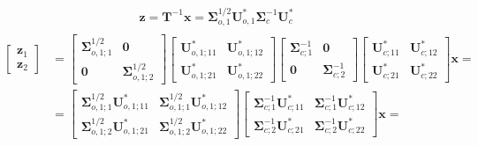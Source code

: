 \documentclass[letterpaper,10pt,english]{jupyterBook}
\begin{document}
\begin{equation*}
\begin{split}\mathbf{z} = \mathbf{T}^{-1} \mathbf{x} = \boldsymbol\Sigma_{o,1}^{1/2} \mathbf{U}_{o,1}^* \boldsymbol\Sigma_c^{-1} \mathbf{U}_c^*\end{split}
\end{equation*}\begin{equation*}
\begin{split}\begin{aligned}
\begin{bmatrix} \mathbf{z}_1 \\ \mathbf{z}_2 \end{bmatrix}
 & =
\begin{bmatrix} \boldsymbol\Sigma_{o,1;1}^{1/2} & \mathbf{0} \\ \mathbf{0} & \boldsymbol\Sigma_{o,1;2}^{1/2} \end{bmatrix}
\begin{bmatrix} \mathbf{U}_{o,1;11}^* & \mathbf{U}_{o,1;12}^* \\ \mathbf{U}_{o,1;21}^* & \mathbf{U}_{o,1;22}^* \end{bmatrix}
\begin{bmatrix} \boldsymbol\Sigma_{c  ;1}^{-1 } & \mathbf{0} \\ \mathbf{0} & \boldsymbol\Sigma_{c;2}^{-1} \end{bmatrix}
\begin{bmatrix} \mathbf{U}_{c;11}^* & \mathbf{U}_{c;12}^* \\ \mathbf{U}_{c;21}^* & \mathbf{U}_{c;22}^* \end{bmatrix}
 \mathbf{x} = \\
 & =
\begin{bmatrix} \boldsymbol\Sigma_{o,1;1}^{1/2}\mathbf{U}_{o,1;11}^* & \boldsymbol\Sigma_{o,1;1}^{1/2}\mathbf{U}_{o,1;12}^* \\ \boldsymbol\Sigma_{o,1;2}^{1/2} \mathbf{U}_{o,1;21}^* & \boldsymbol\Sigma_{o,1;2}^{1/2} \mathbf{U}_{o,1;22}^* \end{bmatrix}
\begin{bmatrix} \boldsymbol\Sigma_{c  ;1}^{-1 }\mathbf{U}_{c;11}^* & \boldsymbol\Sigma_{c  ;1}^{-1 }\mathbf{U}_{c;12}^* \\ \boldsymbol\Sigma_{c;2}^{-1}\mathbf{U}_{c;21}^* & \boldsymbol\Sigma_{c;2}^{-1}\mathbf{U}_{c;22}^* \end{bmatrix}
 \mathbf{x} = \\
\end{aligned}\end{split}
\end{equation*}
\sphinxAtStartPar
{} 
\end{document}
